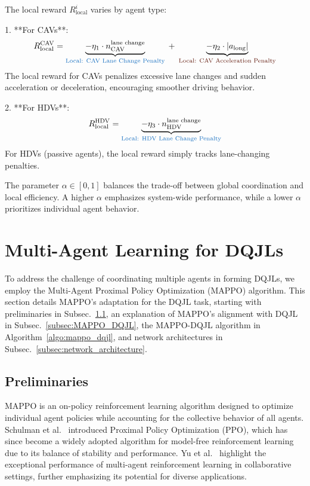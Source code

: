 The local reward \(R_{\text{local}}^i\) varies by agent type:

1. **For CAVs**:
   \[
R_{\text{local}}^{\text{CAV}} = 
\underbrace{-\eta_1 \cdot n_{\text{CAV}}^{\text{lane change}}}_{\textcolor{RoyalBlue}{\text{Local: CAV Lane Change Penalty}}}
\;+\;
\underbrace{-\eta_2 \cdot |a_{\text{long}}|}_{\textcolor{Sepia}{\text{Local: CAV Acceleration Penalty}}}
\]
   The local reward for CAVs penalizes excessive lane changes and sudden acceleration or deceleration, encouraging smoother driving behavior.

2. **For HDVs**:
\[
R_{\text{local}}^{\text{HDV}} = 
\underbrace{- \eta_3 \cdot n_{\text{HDV}}^{\text{lane change}}}_{\textcolor{RoyalBlue}{\text{Local: HDV Lane Change Penalty}}}
\]
   For HDVs (passive agents), the local reward simply tracks lane-changing penalties.

The parameter \(\alpha \in [0,1]\) balances the trade-off between global coordination and local efficiency. A higher \(\alpha\) emphasizes system-wide performance, while a lower \(\alpha\) prioritizes individual agent behavior.


\section{Multi-Agent Learning for DQJLs}
\label{sec:learning}
To address the challenge of coordinating multiple agents in forming DQJLs, we employ the Multi-Agent Proximal Policy Optimization (MAPPO) algorithm. This section details MAPPO's adaptation for the DQJL task, starting with preliminaries in Subsec.~\ref{subsec:preliminaries}, an explanation of MAPPO's alignment with DQJL in Subsec.~\ref{subsec:MAPPO_DQJL}, the MAPPO-DQJL algorithm in Algorithm~\ref{algo:mappo_dqjl}, and network architectures in Subsec.~\ref{subsec:network_architecture}.

\subsection{Preliminaries}
\label{subsec:preliminaries}
MAPPO is an on-policy reinforcement learning algorithm designed to optimize individual agent policies while accounting for the collective behavior of all agents. Schulman et al.~\cite{schulman2017proximal} introduced Proximal Policy Optimization (PPO), which has since become a widely adopted algorithm for model-free reinforcement learning due to its balance of stability and performance. Yu et al.~\cite{yu2022surprising} highlight the exceptional performance of multi-agent reinforcement learning in collaborative settings, further emphasizing its potential for diverse applications.

